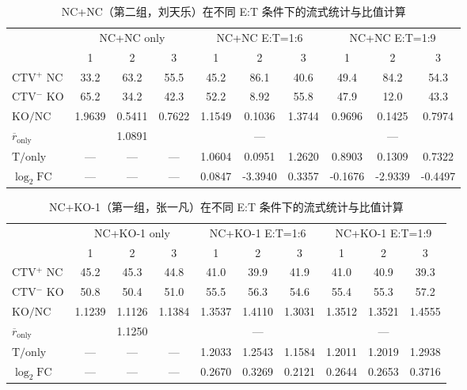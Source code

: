 \begin{table}[H]
    \centering
    \caption{NC+NC（第二组，刘天乐）在不同 E:T 条件下的流式统计与比值计算}
    \label{tab:ltl-ncnc}
    \begin{tabular}{lccccccccc}
        \toprule
        & \multicolumn{3}{c}{NC+NC only}
        & \multicolumn{3}{c}{NC+NC E:T=1:6}
        & \multicolumn{3}{c}{NC+NC E:T=1:9} \\
        \cmidrule(lr){2-4}\cmidrule(lr){5-7}\cmidrule(lr){8-10}
        & 1 & 2 & 3 & 1 & 2 & 3 & 1 & 2 & 3 \\
        \midrule
        CTV$^+$ NC  & 33.2 & 63.2 & 55.5 & 45.2 & 86.1 & 40.6 & 49.4 & 84.2 & 54.3 \\
        CTV$^{-}$ KO  & 65.2 & 34.2 & 42.3 & 52.2 & 8.92 & 55.8 & 47.9 & 12.0 & 43.3 \\
        \midrule
        $\mathrm{KO/NC}$    & 1.9639 & 0.5411 & 0.7622 & 1.1549 & 0.1036 & 1.3744 & 0.9696 & 0.1425 & 0.7974 \\
        $\overline{r}_{\mathrm{only}}$ & \multicolumn{3}{c}{1.0891} & \multicolumn{3}{c}{---} & \multicolumn{3}{c}{---} \\
        \midrule
        $\mathrm{T/only}$   & ---  & ---  & --- & 1.0604 & 0.0951 & 1.2620 & 0.8903 & 0.1309 & 0.7322 \\
        $\log_2 \mathrm{FC}$   & ---  & ---  & --- & 0.0847 & -3.3940 & 0.3357 & -0.1676 & -2.9339 & -0.4497 \\
        \bottomrule
    \end{tabular}
\end{table}

\begin{table}[H]
    \centering
    \caption{NC+KO-1（第一组，张一凡）在不同 E:T 条件下的流式统计与比值计算}
    \label{tab:zyf-ncko1}
    \begin{tabular}{lccccccccc}
        \toprule
        & \multicolumn{3}{c}{NC+KO-1 only}
        & \multicolumn{3}{c}{NC+KO-1 E:T=1:6}
        & \multicolumn{3}{c}{NC+KO-1 E:T=1:9} \\
        \cmidrule(lr){2-4}\cmidrule(lr){5-7}\cmidrule(lr){8-10}
        & 1 & 2 & 3 & 1 & 2 & 3 & 1 & 2 & 3 \\
        \midrule
        CTV$^+$ NC  & 45.2 & 45.3 & 44.8 & 41.0 & 39.9 & 41.9 & 41.0 & 40.9 & 39.3 \\
        CTV$^{-}$ KO  & 50.8 & 50.4 & 51.0 & 55.5 & 56.3 & 54.6 & 55.4 & 55.3 & 57.2 \\
        \midrule
        $\mathrm{KO/NC}$    & 1.1239 & 1.1126 & 1.1384 & 1.3537 & 1.4110 & 1.3031 & 1.3512 & 1.3521 & 1.4555 \\
        $\overline{r}_{\mathrm{only}}$ & \multicolumn{3}{c}{1.1250} & \multicolumn{3}{c}{---} & \multicolumn{3}{c}{---} \\
        \midrule
        $\mathrm{T/only}$   & ---  & ---  & --- & 1.2033 & 1.2543 & 1.1584 & 1.2011 & 1.2019 & 1.2938 \\
        $\log_2 \mathrm{FC}$   & ---  & ---  & --- & 0.2670 & 0.3269 & 0.2121 & 0.2644 & 0.2653 & 0.3716 \\
        \bottomrule
    \end{tabular}
\end{table}

